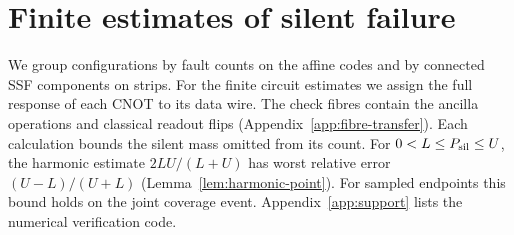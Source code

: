 \documentclass[10pt,twocolumn]{article}
\theoremstyle{definition}
\begin{document}
\section{Finite estimates of silent failure}\label{sec:finite-estimates}

We group configurations by fault counts on the affine codes and by
connected SSF components on strips. For the finite circuit estimates
we assign the full response of each CNOT to its data wire. The check
fibres contain the ancilla operations and classical readout flips
(Appendix~\ref{app:fibre-transfer}). Each calculation bounds the silent
mass omitted from its count. For $0<L\le P_{\rm sil}\le U$, the
harmonic estimate $2LU/(L+U)$ has worst relative error $(U-L)/(U+L)$
(Lemma~\ref{lem:harmonic-point}). For sampled endpoints this bound
holds on the joint coverage event. Appendix~\ref{app:support} lists
the numerical verification code.
\end{document}
